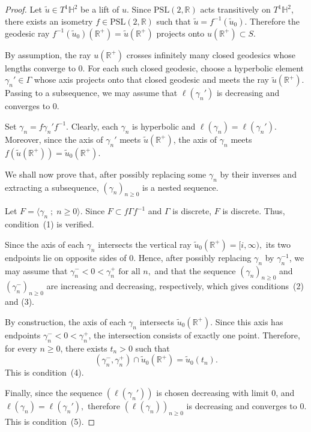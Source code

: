 \documentclass[a4paper,english,reqno]{amsart}
\newcommand{\R}{\mathbb{R}}
\theoremstyle{definition}
\numberwithin{equation}{section}
\begin{document}
\begin{proof}
	Let $\tilde u\in T^1\mathbb H^2$ be a lift of $u$.	
	Since $\mathrm{PSL}(2,\mathbb R)$ acts transitively on $T^1\mathbb H^2$, there exists an isometry
	$
	f\in \mathrm{PSL}(2,\mathbb R)
	$
	such that
	$
	\tilde u=f^{-1}(\tilde u_0).
	$
	Therefore the geodesic ray
	$
	f^{-1}(\tilde u_0)(\mathbb R^+)=\tilde u(\mathbb R^+)
	$
	projects onto
	$
	u(\mathbb R^+)\subset S.
	$
	
	By assumption, the ray $u(\mathbb R^+)$ crosses infinitely many closed geodesics whose lengths converge to $0$. For each such closed geodesic, choose a hyperbolic element
	$
	\gamma_n'\in \Gamma
	$
	whose axis projects onto that closed geodesic and meets the ray $\tilde u(\R^+)$. Passing to a subsequence, we may assume that
	$
	\ell(\gamma_n')
	$
	is decreasing and converges to $0$.
	
	Set
	$
	\gamma_n=f\gamma_n'f^{-1}.
	$
	Clearly, each $\gamma_n$ is hyperbolic and
	$
	\ell(\gamma_n)=\ell(\gamma_n').
	$
	Moreover, since the axis of $\gamma_n'$ meets $\tilde u(\mathbb R^+)$, the axis of $\gamma_n$ meets
	$
	f(\tilde u(\mathbb R^+))=\tilde u_0(\mathbb R^+).
	$
	
	We shall now prove that, after possibly replacing some $\gamma_n$ by their inverses and extracting a subsequence, $(\gamma_n)_{n\geq 0}$ is a nested sequence.
	
	\medskip
	
	\noindent
	Let
	$
	F=\langle \gamma_n \; ;\; n\geq 0\rangle.
	$
	Since
	$
	F\subset f\Gamma f^{-1}
	$
	and $\Gamma$ is discrete, $F$ is discrete. Thus, condition~(1) is verified.
	
	\medskip
	
	\noindent
	Since the axis of each $\gamma_n$ intersects the vertical ray
	$
	\tilde u_0(\mathbb R^+)=[i,\infty),
	$
	its two endpoints lie on opposite sides of $0$. Hence, after possibly replacing $\gamma_n$ by $\gamma_n^{-1}$, we may assume that
	$
	\gamma_n^-<0<\gamma_n^+
	 \text{ for all }n,
	$ and that the sequence $(\gamma_n)_{n\geq 0}$ and $(\gamma_n^-)_{n\geq 0}$ are increasing and decreasing, respectively, which gives conditions~(2) and (3). 
	
	By construction, the axis of each $\gamma_n$ intersects $\tilde u_0(\mathbb R^+)$. Since this axis has endpoints $\gamma_n^-<0<\gamma_n^+$, the intersection consists of exactly one point. Therefore, for every $n\geq 0$, there exists $t_n>0$ such that
	\[
	(\gamma_n^-,\gamma_n^+)\cap \tilde u_0(\mathbb R^+)=\tilde u_0(t_n).
	\]
	This is condition~(4).
	
	\medskip
	
	\noindent
	Finally, since the sequence $(\ell(\gamma_n'))$ is chosen decreasing with limit $0$, and
	$
	\ell(\gamma_n)=\ell(\gamma_n'),
	$
	therefore $(\ell(\gamma_n))_{n\geq 0}$ is decreasing and converges to $0$. This is condition~(5).
	
	\medskip
\end{proof}
\end{document}
